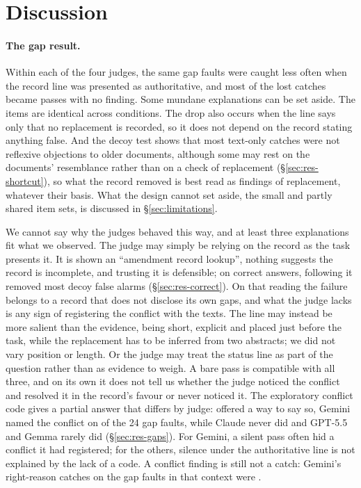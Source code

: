 \section{Discussion}
\label{sec:discussion}

\paragraph{The gap result.}
Within each of the four judges, the same gap faults were caught less often when the record line was presented as authoritative, and
most of the lost catches became passes with no finding. Some mundane explanations can be set aside. The items are
identical across conditions. The drop also occurs when the line says only that no replacement is recorded, so it does
not depend on the record stating anything false. And the decoy test shows that most text-only catches were not
reflexive objections to older documents, although some may rest on the documents' resemblance rather than on a
check of replacement (\S\ref{sec:res-shortcut}), so what the record removed is best read as findings of
replacement, whatever their basis. What the design cannot set aside, the small and partly shared item sets, is discussed in
\S\ref{sec:limitations}.

We cannot say why the judges behaved this way, and at least three explanations fit what we observed. The judge may
simply be relying on the record as the task presents it. It is shown an ``amendment record lookup'', nothing suggests
the record is incomplete, and trusting it is defensible; on correct answers, following it removed most decoy false
alarms (\S\ref{sec:res-correct}). On that reading the failure belongs to a record that does not disclose its own gaps,
and what the judge lacks is any sign of registering the conflict with the texts. The line may instead be more salient
than the evidence, being short, explicit and placed just before the task, while the replacement has to be inferred
from two abstracts; we did not vary position or length. Or the judge may treat the status line as part of the question
rather than as evidence to weigh. A bare pass is compatible with all three, and on its own it does not tell us whether the judge
noticed the conflict and resolved it in the record's favour or never noticed it. The exploratory conflict code gives
a partial answer that differs by judge: offered a way to say so, Gemini named the conflict on \EGeminiConflictCodeGap{}
of the 24 gap faults, while Claude never did and GPT-5.5 and Gemma rarely did (\S\ref{sec:res-gaps}). For Gemini, a
silent pass often hid a conflict it had registered; for the others, silence under the authoritative line is not
explained by the lack of a code. A conflict finding is still not a catch: Gemini's right-reason catches on the gap faults
in that context were \EGeminiGapConflict.

